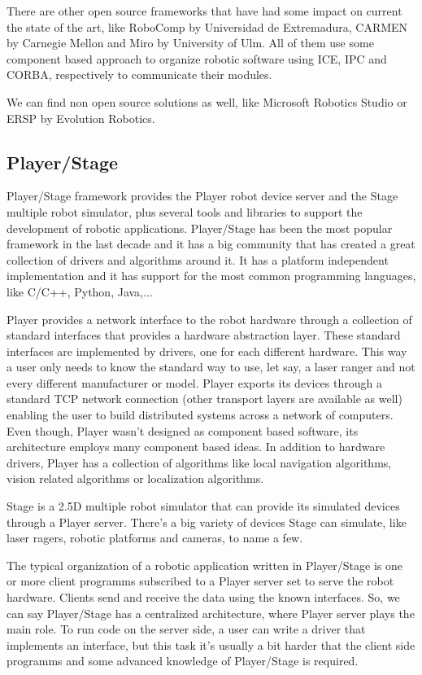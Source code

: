 \documentclass[twocolumn]{svjour3}          %
\begin{document}
There are other open source frameworks that have had some impact on current the state of the art, like RoboComp \cite{bustos2011} by Universidad de Extremadura, CARMEN \cite{montemerlo03} by Carnegie Mellon and Miro \cite{Kraetzschmar02} by University of Ulm. All of them use some component based approach to organize robotic software using ICE, IPC and CORBA, respectively to communicate their modules.

We can find non open source solutions as well, like Microsoft Robotics Studio or ERSP by Evolution Robotics. 

\subsection{Player/Stage}

Player/Stage framework provides the Player robot device server and the
Stage multiple robot simulator, plus several tools and libraries to support the
development of robotic applications. Player/Stage has been the most
popular framework in the last decade and it has a big community that
has created a great collection of drivers and algorithms around it. It has a platform independent implementation and it has support for the most common programming languages, like C/C++, Python, Java,...

Player provides a network interface to the robot hardware through a collection of standard
interfaces that provides a hardware abstraction layer. These standard interfaces are implemented by drivers, one
for each different hardware. This way a user only needs to know the
standard way to use, let say, a laser ranger and not every different
manufacturer or model. Player exports its devices through a standard TCP network
connection  (other transport layers are available as well)
enabling the user to build distributed systems across a network of
computers. Even though, Player wasn't designed as component based software, its architecture employs many component based
ideas. In addition to hardware drivers, Player has a collection of algorithms
like local navigation algorithms, vision related algorithms or
localization algorithms. 

Stage is a 2.5D multiple robot simulator that can provide its
simulated devices through a Player server. There's a big variety of
devices Stage can simulate, like laser ragers, robotic platforms and
cameras, to name a few.

The typical organization of a robotic application written in Player/Stage is one or more client programms subscribed to a Player server set to serve the robot hardware. Clients send and receive the data using the known interfaces. So, we can say Player/Stage has a centralized architecture, where Player server plays the main role. To run code on the server side, a user can write a driver that implements an interface, but this task it's usually a bit harder that the client side programms and some advanced knowledge of Player/Stage is required.
\end{document}
